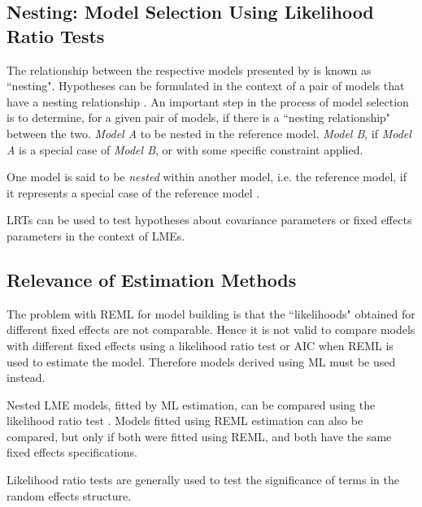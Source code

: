\documentclass[12pt, a4paper]{report}
\theoremstyle{plain}
\theoremstyle{definition}
\theoremstyle{remark}
\begin{document}
	\subsection{Nesting: Model Selection Using Likelihood Ratio Tests}
	The relationship between the respective models presented by \citet{ARoy2009} is known as ``nesting".
	Hypotheses can be formulated in the context of a pair of models that have a nesting relationship \citet{west}.
	An important step in the process of model selection is to determine, for a given pair of models, if there is a ``nesting relationship" between the two.
	\textit{Model A} to be nested in the reference model, \textit{Model B}, if \textit{Model A} is a special case
	of \textit{Model B}, or with some specific constraint applied.
	
	One model is said to be \emph{nested} within another model, i.e. the reference model, if it represents a special case of the reference model \citep{PB}.
	
	
	
	
	LRTs can be used to test hypotheses about covariance parameters or fixed effects
	parameters in the context of LMEs.
	
	
	
	
	\subsection{Relevance of Estimation Methods}
	
	The problem with REML for model building is that the ``likelihoods" obtained for different fixed effects are not comparable. Hence it is not valid to compare models with different fixed effects using a likelihood ratio test or AIC when REML is used to estimate the model. Therefore models derived using ML must be used instead.
	
	
	
	Nested LME models, fitted by ML estimation, can be compared using the likelihood ratio test \citep{Lehmann2006}.
	Models fitted using REML estimation can also be compared, but only if both were fitted using REML, and both have the same fixed effects specifications.
	
	Likelihood ratio tests are generally used to test the significance of terms in the random effects structure.

	
	
	
	
	
\end{document}
